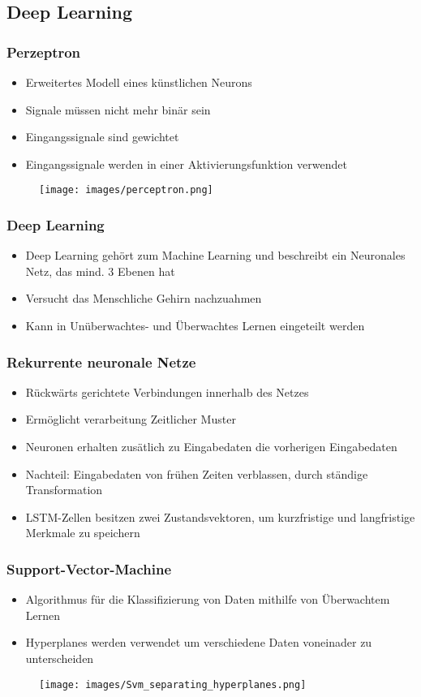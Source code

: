 \documentclass[utf8x, xcolor=dvipsnames]{beamer}
\begin{document}
\subsection{Deep Learning}

\begin{frame}
\frametitle{Perzeptron}
\begin{itemize}
	\item Erweitertes Modell eines künstlichen Neurons
	\item Signale müssen nicht mehr binär sein
	\item Eingangssignale sind gewichtet
	\item Eingangssignale werden in einer Aktivierungsfunktion verwendet
\end{itemize}
\begin{figure}
	\texttt{[image: images/perceptron.png]}
\end{figure}
\end{frame}

\begin{frame}
\frametitle{Deep Learning}
\begin{itemize}
	\item Deep Learning gehört zum Machine Learning und beschreibt ein Neuronales Netz, das mind. 3 Ebenen hat
	\item Versucht das Menschliche Gehirn nachzuahmen
	\item Kann in Unüberwachtes- und Überwachtes Lernen eingeteilt werden
\end{itemize}
\end{frame}

\begin{frame}
\frametitle{Rekurrente neuronale Netze}
\begin{itemize}
	\item Rückwärts gerichtete Verbindungen innerhalb des Netzes
	\item Ermöglicht verarbeitung Zeitlicher Muster
	\item Neuronen erhalten zusätlich zu Eingabedaten die vorherigen Eingabedaten
	\item Nachteil: Eingabedaten von frühen Zeiten verblassen, durch ständige Transformation
	\item LSTM-Zellen besitzen zwei Zustandsvektoren, um kurzfristige und langfristige Merkmale zu speichern
\end{itemize}
\end{frame}

\begin{frame}
\frametitle{Support-Vector-Machine}
\begin{itemize}
	\item Algorithmus für die Klassifizierung von Daten mithilfe von Überwachtem Lernen
	\item Hyperplanes werden verwendet um verschiedene Daten voneinader zu unterscheiden
\end{itemize}
\begin{figure}
	\texttt{[image: images/Svm\_separating\_hyperplanes.png]}
\end{figure}
\end{frame}
\end{document}
